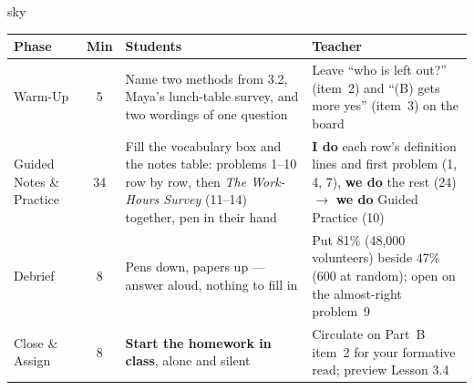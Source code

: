 \documentclass[10pt]{article}
\begin{document}
\boxguard[30]
\begin{skillbox}{sky}
\renewcommand{\arraystretch}{1.25}
\begin{tabularx}{\linewidth}{@{}l c X X@{}}
\textbf{Phase} & \textbf{Min} & \textbf{Students} & \textbf{Teacher} \\
\hline
Warm-Up & 5 & Name two methods from 3.2, Maya's lunch-table survey, and two wordings of one
question & Leave ``who is left out?'' (item~2) and ``(B) gets more yes'' (item~3) on the
board \\
Guided Notes \& Practice & 34 & Fill the vocabulary box and the notes table: problems 1--10 row
by row, then \emph{The Work-Hours Survey} (11--14) together, pen in their hand & \textbf{I do}
each row's definition lines and first problem (1, 4, 7), \textbf{we do} the rest (24)
$\to$ \textbf{we do} Guided Practice (10) \\
Debrief & 8 & Pens down, papers up --- answer aloud, nothing to fill in & Put 81\% (48{,}000
volunteers) beside 47\% (600 at random); open on the almost-right problem~9 \\
Close \& Assign & 8 & \textbf{Start the homework in class}, alone and silent & Circulate on
Part~B item~2 for your formative read; preview Lesson 3.4 \\
\end{tabularx}
\end{skillbox}
\end{document}
